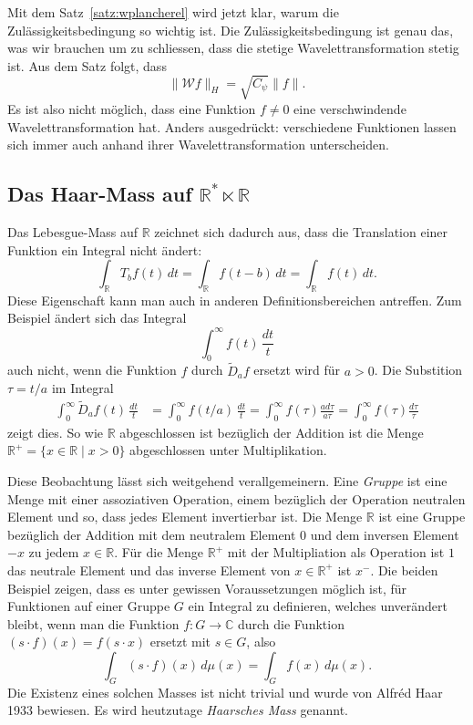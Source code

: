 Mit dem Satz~\ref{satz:wplancherel} wird jetzt klar, warum die
Zulässigkeitsbedingung so wichtig ist.
Die Zulässigkeitsbedingung ist genau das, was wir brauchen um zu schliessen,
dass die stetige Wavelettransformation stetig ist.
Aus dem Satz folgt, dass
\[
\| \mathcal{W}f \|_H = \sqrt{C_{\psi}}\|f\|.
\]
Es ist also nicht möglich, dass eine Funktion $f\ne 0$ eine verschwindende
Wavelettransformation hat.
Anders ausgedrückt: verschiedene Funktionen lassen sich immer auch anhand
ihrer Wavelettransformation unterscheiden.

\subsection{Das Haar-Mass auf $\mathbb R^* \ltimes \mathbb R$
\label{subsection:haar-mass}}
Das Lebesgue-Mass auf $\mathbb R$ zeichnet sich dadurch aus, dass
die Translation einer Funktion ein Integral nicht ändert:
\[
\int_{\mathbb R} T_bf(t)\,dt
=
\int_{\mathbb R} f(t-b)\,dt
=
\int_{\mathbb R} f(t)\,dt.
\]
Diese Eigenschaft kann man auch in anderen Definitionsbereichen antreffen.
Zum Beispiel ändert sich das Integral
\[
\int_0^\infty f(t)\,\frac{dt}{t}
\]
auch nicht, wenn die Funktion $f$ durch $\tilde{D}_af$ ersetzt wird
für $a>0$.
Die Substition $\tau = t/a$ im Integral
\begin{align*}
\int_0^\infty \tilde{D}_af(t)\,\frac{dt}{t}
&=
\int_0^\infty f(t/a)\,\frac{dt}{t}
=
\int_0^\infty f(\tau) \frac{a d\tau}{a\tau}
=
\int_0^\infty f(\tau) \frac{d\tau}{\tau}
\end{align*}
zeigt dies.
So wie $\mathbb R$ abgeschlossen ist bezüglich der Addition ist die Menge
$\mathbb R^+=\{x\in\mathbb R\;|\; x > 0\}$ abgeschlossen unter Multiplikation.

Diese Beobachtung lässt sich weitgehend verallgemeinern.
Eine {\em Gruppe} ist eine Menge mit einer assoziativen Operation, einem
bezüglich der Operation neutralen Element und so, dass jedes Element
invertierbar ist.
Die Menge $\mathbb R$ ist eine Gruppe bezüglich der Addition mit dem neutralem
Element $0$ und dem inversen Element $-x$ zu jedem $x\in\mathbb R$.
Für die Menge $\mathbb R^+$ mit der Multipliation als Operation ist
$1$ das neutrale Element und das inverse Element von $x\in\mathbb R^+$
ist $x^{-}$.
Die beiden Beispiel zeigen, dass es unter gewissen Voraussetzungen
möglich ist, für Funktionen auf einer Gruppe $G$ ein Integral zu definieren,
welches unverändert bleibt, wenn man die Funktion $f:G\to \mathbb C$ 
durch die Funktion $(s\cdot f)(x) = f(s\cdot x)$ ersetzt mit $s\in G$, also
\[
\int_G (s\cdot f)(x)\,d\mu(x)
=
\int_G f(x)\,d\mu(x).
\]
Die Existenz eines solchen Masses ist nicht trivial und wurde
von Alfréd Haar 1933 bewiesen. 
Es wird heutzutage {\em Haarsches Mass} genannt.


